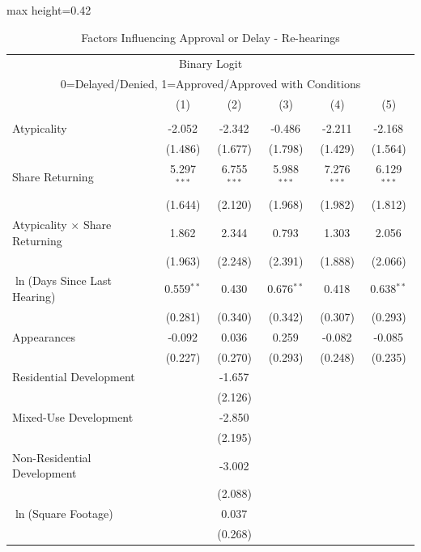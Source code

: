 \begin{table}[H]
\centering
\caption{Factors Influencing Approval or Delay - Re-hearings}
\vspace{0.2cm}
\label{tab_rehearing_delays}
\begin{adjustbox}{max height=0.42\textheight}
\begin{threeparttable}
\begin{tabular}{lccccc}
\multicolumn{6}{c}{Binary Logit} \\
\multicolumn{6}{c}{0=Delayed/Denied, 1=Approved/Approved with Conditions} \\
\toprule
 & (1) & (2) & (3) & (4) & (5) \\
\midrule
 &  &  &  &  & \\
Atypicality  & -2.052$^{}$ & -2.342$^{}$ & -0.486$^{}$ & -2.211$^{}$ & -2.168$^{}$ \\
 & (1.486) & (1.677) & (1.798) & (1.429) & (1.564) \\ [1.8ex]
Share Returning  & 5.297$^{***}$ & 6.755$^{***}$ & 5.988$^{***}$ & 7.276$^{***}$ & 6.129$^{***}$ \\
 & (1.644) & (2.120) & (1.968) & (1.982) & (1.812) \\ [1.8ex]
Atypicality $\times$ Share Returning  & 1.862$^{}$ & 2.344$^{}$ & 0.793$^{}$ & 1.303$^{}$ & 2.056$^{}$ \\
 & (1.963) & (2.248) & (2.391) & (1.888) & (2.066) \\ [1.8ex]
$\ln$(Days Since Last Hearing)  & 0.559$^{**}$ & 0.430$^{}$ & 0.676$^{**}$ & 0.418$^{}$ & 0.638$^{**}$ \\
 & (0.281) & (0.340) & (0.342) & (0.307) & (0.293) \\ [1.8ex]
Appearances  & -0.092$^{}$ & 0.036$^{}$ & 0.259$^{}$ & -0.082$^{}$ & -0.085$^{}$ \\
 & (0.227) & (0.270) & (0.293) & (0.248) & (0.235) \\ [1.8ex]
Residential Development  &  & -1.657$^{}$ &  &  &  \\
 &  & (2.126) &  &  &  \\ [1.8ex]
Mixed-Use Development  &  & -2.850$^{}$ &  &  &  \\
 &  & (2.195) &  &  &  \\ [1.8ex]
Non-Residential Development  &  & -3.002$^{}$ &  &  &  \\
 &  & (2.088) &  &  &  \\ [1.8ex]
$\ln$(Square Footage)  &  & 0.037$^{}$ &  &  &  \\
 &  & (0.268) &  &  &  \\ [1.8ex]

\end{tabular}
\end{threeparttable}
\end{adjustbox}
\end{table}
